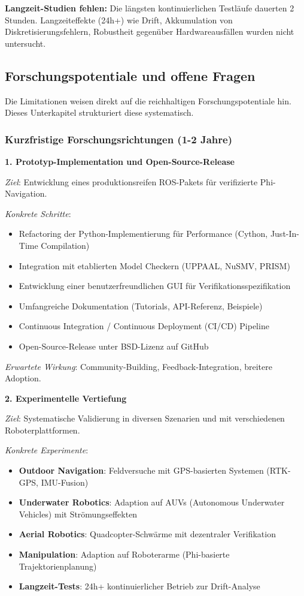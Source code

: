 ﻿\documentclass[a4paper,12pt]{article}
\theoremstyle{definition}
\begin{document}
\textbf{Langzeit-Studien fehlen:}
Die längsten kontinuierlichen Testläufe dauerten 2 Stunden. Langzeiteffekte (24h+) wie Drift, Akkumulation von Diskretisierungsfehlern, Robustheit gegenüber Hardwareausfällen wurden nicht untersucht.

\subsection{Forschungspotentiale und offene Fragen}

Die Limitationen weisen direkt auf die reichhaltigen Forschungspotentiale hin. Dieses Unterkapitel strukturiert diese systematisch.

\subsubsection{Kurzfristige Forschungsrichtungen (1-2 Jahre)}

\textbf{1. Prototyp-Implementation und Open-Source-Release}

\textit{Ziel}: Entwicklung eines produktionsreifen ROS-Pakets für verifizierte Phi-Navigation.

\textit{Konkrete Schritte}:
\begin{itemize}
	\item Refactoring der Python-Implementierung für Performance (Cython, Just-In-Time Compilation)
	\item Integration mit etablierten Model Checkern (UPPAAL, NuSMV, PRISM)
	\item Entwicklung einer benutzerfreundlichen GUI für Verifikationsspezifikation
	\item Umfangreiche Dokumentation (Tutorials, API-Referenz, Beispiele)
	\item Continuous Integration / Continuous Deployment (CI/CD) Pipeline
	\item Open-Source-Release unter BSD-Lizenz auf GitHub
\end{itemize}

\textit{Erwartete Wirkung}: Community-Building, Feedback-Integration, breitere Adoption.

\textbf{2. Experimentelle Vertiefung}

\textit{Ziel}: Systematische Validierung in diversen Szenarien und mit verschiedenen Roboterplattformen.

\textit{Konkrete Experimente}:
\begin{itemize}
	\item \textbf{Outdoor Navigation}: Feldversuche mit GPS-basierten Systemen (RTK-GPS, IMU-Fusion)
	\item \textbf{Underwater Robotics}: Adaption auf AUVs (Autonomous Underwater Vehicles) mit Strömungseffekten
	\item \textbf{Aerial Robotics}: Quadcopter-Schwärme mit dezentraler Verifikation
	\item \textbf{Manipulation}: Adaption auf Roboterarme (Phi-basierte Trajektorienplanung)
	\item \textbf{Langzeit-Tests}: 24h+ kontinuierlicher Betrieb zur Drift-Analyse
\end{itemize}
\end{document}

